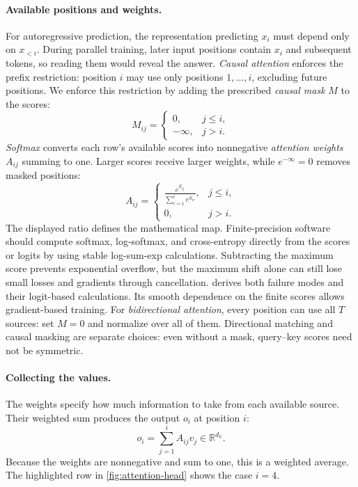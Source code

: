\documentclass[11pt,twoside]{article}
\newcommand{\R}{\mathbb R}
\theoremstyle{plain}
\theoremstyle{definition}
\theoremstyle{remark}
\begin{document}
\paragraph{Available positions and weights.}
For autoregressive prediction, the representation predicting $x_i$ must
depend only on $x_{<i}$. During parallel training, later input positions
contain $x_i$ and subsequent tokens, so reading them would reveal the answer.
\emph{Causal attention} enforces the prefix restriction: position $i$ may
use only positions $1,\ldots,i$, excluding future positions.
We enforce this restriction by adding the prescribed \emph{causal mask} $M$ to the scores:
\begin{equation}
M_{ij}=\begin{cases}
0,&j\leq i,\\
-\infty,&j>i.
\end{cases}
\label{eq:causal-mask}
\end{equation}
\emph{Softmax} converts each row's available scores into nonnegative \emph{attention weights} $A_{ij}$
summing to one. Larger scores receive larger weights, while
$e^{-\infty}=0$ removes masked positions:
\[
A_{ij}=
\begin{cases}
\displaystyle\frac{e^{S_{ij}}}{\sum_{r=1}^i e^{S_{ir}}},&j\leq i,\\[2mm]
0,&j>i.
\end{cases}
\]
The displayed ratio defines the mathematical map. Finite-precision software
should compute softmax, log-softmax, and cross-entropy directly from the scores
or logits by using stable log-sum-exp calculations. Subtracting the maximum
score prevents exponential overflow, but the maximum shift alone can still
lose small losses and gradients through cancellation.
 derives both failure modes and their logit-based
calculations.
Its smooth dependence on the finite scores allows gradient-based training.
For \emph{bidirectional attention}, every position can use all $T$ sources:
set $M=0$ and normalize over all of them. Directional matching and causal
masking are separate choices: even without a mask, query--key scores need
not be symmetric.

\paragraph{Collecting the values.}
The weights specify how much information to take from each available
source. Their weighted sum produces the output $o_i$ at position $i$:
\begin{equation}
o_i=\sum_{j=1}^i A_{ij}v_j\in\R^{d_h}.
\label{eq:head-at-one-position}
\end{equation}
Because the weights are nonnegative and sum to one, this is a weighted
average. The highlighted row in \cref{fig:attention-head} shows the case
$i=4$.
\end{document}
